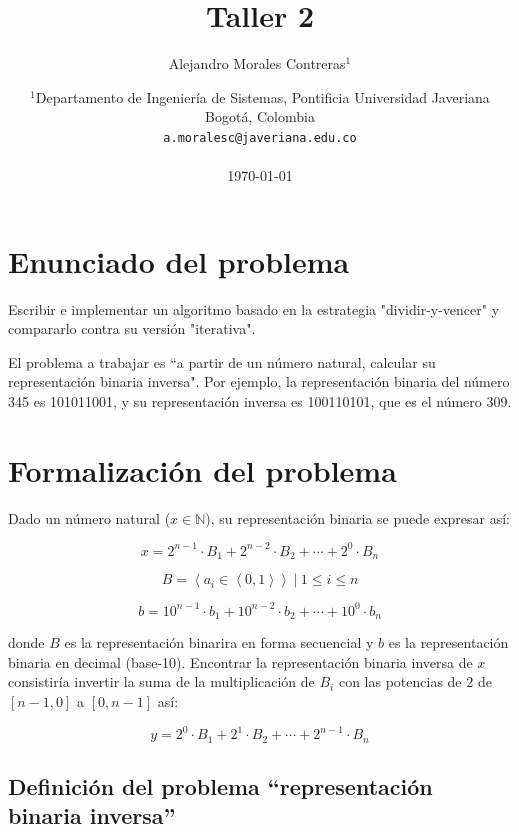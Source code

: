 \documentclass[letter]{article}
\title{Taller 2}
\author{Alejandro Morales Contreras$^1$}
\date{
	$^1$Departamento de Ingeniería de Sistemas, Pontificia Universidad Javeriana\\Bogotá,  Colombia \\
	\texttt{a.moralesc@javeriana.edu.co}\\~\\
	\today
}
\begin{document}
\maketitle

\tableofcontents

\section{Enunciado del problema} \label{enunciado}

Escribir e implementar un algoritmo basado en la estrategia "dividir-y-vencer" y compararlo contra su versión "iterativa". \par

El problema a trabajar es ``a partir de un número natural, calcular su representación binaria inversa". Por ejemplo, la representación binaria del número 345 es 101011001, y su representación inversa es 100110101, que es el número 309. \par

\section{Formalización del problema} \label{formalizacion}

Dado un número natural ($x \in \mathbb{N}$), su representación binaria se puede expresar así: \par

\[ x = 2^{n-1} \cdot B_1 + 2^{n-2} \cdot B_2 + \cdots + 2^{0} \cdot B_n  \]

\[ B = \left< a_i \in \left< 0, 1 \right> \right> ~|~ 1 \leq i \leq n \]

\[ b = 10^{n - 1} \cdot b_1 + 10^{n - 2} \cdot b_2 + \cdots + 10^{0} \cdot b_n \]

donde $B$ es la representación binarira en forma secuencial y $b$ es la representación binaria en decimal (base-10). Encontrar la representación binaria inversa de $x$ consistiría invertir la suma de la multiplicación de $B_i$ con las potencias de $2$ de $[n-1, 0]$ a $[0, n-1]$ así: \par

\[ y = 2^{0} \cdot B_1 + 2^{1} \cdot B_2 + \cdots + 2^{n-1} \cdot B_n \]

\subsection{Definición del problema ``representación binaria inversa''} \label{formalizacion:definicion}
\end{document}

